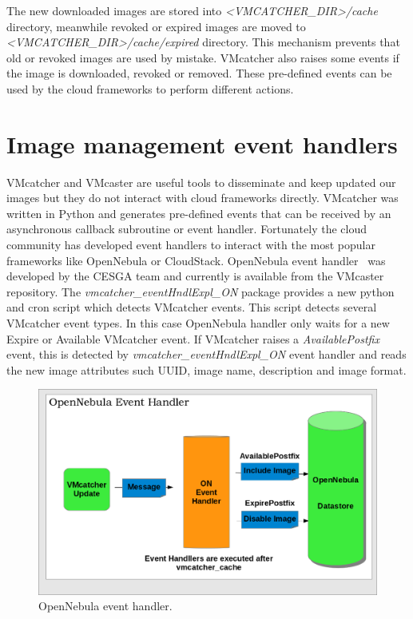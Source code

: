 \documentclass[oribibl]{llncs_Ibergrid2013}
\begin{document}
The new downloaded images are stored into \textit{<VMCATCHER\_DIR>/cache} directory, meanwhile revoked or expired images are moved to \textit{<VMCATCHER\_DIR>/cache/expired} directory. 
This mechanism prevents that old or revoked images are used by mistake. VMcatcher also raises some events if the image is downloaded, revoked or removed. 
These pre-defined events can be used by the cloud frameworks to perform different actions.

\section{Image management event handlers}
\label{sect-handlers}
VMcatcher and VMcaster are useful tools to disseminate and keep updated our images but they do not interact with cloud frameworks directly.
VMcatcher was written in Python and generates pre-defined events that can be received by an asynchronous callback subroutine or event handler.
Fortunately the cloud community has developed event handlers to interact with the most popular frameworks like OpenNebula or CloudStack.
OpenNebula event handler~\cite{onevent} was developed by the CESGA team and currently is available from the VMcaster repository. 
The \textit{vmcatcher\_eventHndlExpl\_ON} package provides a new python and cron script which detects VMcatcher events. 
This script detects several VMcatcher event types. In this case OpenNebula handler only waits for a new Expire or Available VMcatcher event.
If VMcatcher raises a \textit{AvailablePostfix} event, this is detected by \textit{vmcatcher\_eventHndlExpl\_ON} event handler and reads the new image attributes such UUID, image name, description and image format.
\begin{figure}[h]
\centering
\includegraphics[width=1\textwidth]{ONeventhandler.png}
\caption{OpenNebula event handler.}
\label{fig:onevent}
\end{figure}
\end{document}
